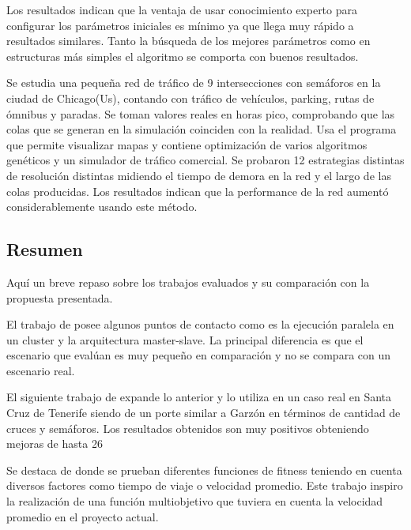 \begin{itemize}
\begin{item}
Los resultados indican que la ventaja de usar conocimiento experto para configurar los parámetros iniciales es mínimo ya que llega muy rápido a resultados similares. Tanto la búsqueda de los mejores parámetros como en estructuras más simples el algoritmo se comporta con buenos resultados.
		
	\end{item}	
	
	\begin{item}

Se estudia una pequeña red de tráfico de 9 intersecciones con semáforos en la ciudad de Chicago(Us), contando con tráfico de vehículos, parking, rutas de ómnibus y paradas.  
Se toman valores reales en horas pico, comprobando que las colas que se generan en la simulación coinciden con la realidad.
Usa el programa \citep{TRANSYT-7F} que permite visualizar mapas y contiene optimización de varios algoritmos genéticos 
 y \citep{CORSIM}  un simulador de tráfico comercial.
Se probaron 12 estrategias distintas de resolución distintas midiendo el tiempo de demora en la red y el largo de las colas producidas. Los resultados indican que la performance de la red aumentó considerablemente usando este método.	
	\end{item}	

\end{itemize}


\subsection{Resumen}
Aquí un breve repaso sobre los trabajos evaluados y su comparación con la propuesta presentada.

El trabajo de \citet{Sanchez2004} posee algunos puntos de contacto como es la ejecución paralela en un cluster y la arquitectura master-slave. La principal diferencia es que el escenario que evalúan es muy pequeño en comparación y no se compara con un escenario real.

El siguiente trabajo de \citep{Sanchez2008} expande lo anterior y lo utiliza en un caso real en Santa Cruz de Tenerife siendo de un porte similar a Garzón en términos de cantidad de cruces y semáforos. Los resultados obtenidos son muy positivos obteniendo mejoras de hasta 26%

Se destaca de \citep{Sanchez2010} donde se prueban diferentes funciones de fitness teniendo en cuenta diversos factores como tiempo de viaje o velocidad promedio. Este trabajo inspiro la realización de una función multiobjetivo que tuviera en cuenta la velocidad promedio en el proyecto actual.

